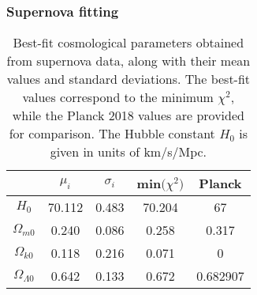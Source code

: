\documentclass{aa}
\begin{document}
\subsubsection{Supernova fitting}
\begin{table}
  \caption{Best-fit cosmological parameters obtained from supernova data, along with their mean values and standard deviations. The best-fit values correspond to the minimum $\chi^2$, while the Planck 2018 values are provided for comparison. The Hubble constant $H_0$ is given in units of km/s/Mpc.}             %
  \label{table:supernova}      %
  \centering                          %
  \begin{tabular}{| c || c | c | c | c |}        %
  \hline                %
   & \hspace{5pt}$\mu_i$\hspace{5pt} & \hspace{7pt}$\sigma_i$\hspace{7pt} & min$\big(\chi^2\big)$ & Planck \\    %
  \hline\hline                     %
  $H_0$ & 70.112 & 0.483 & 70.204 & 67 \\
  \hline
  $\Omega_{m0}$ & \hspace{5pt}0.240 & 0.086 & \hspace{5pt}0.258 & 0.317 \\
  \hline
  $\Omega_{k0}$ & \hspace{5pt}0.118 & 0.216 & \hspace{5pt}0.071 & 0 \\
  \hline
  $\Omega_{\Lambda0}$ & \hspace{5pt}0.642 & 0.133 & \hspace{5pt}0.672 & 0.682907 \\
  \hline                                   %
  \end{tabular}
\end{table}
\end{document}
